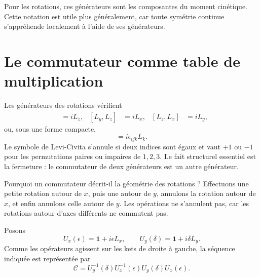 Pour les rotations, ces générateurs sont les composantes du moment cinétique. Cette notation est utile plus généralement, car toute symétrie continue s’appréhende localement à l’aide de ses générateurs.

\section{Le commutateur comme table de multiplication}

Les générateurs des rotations vérifient
\begin{align}
[L_x,L_y]&=iL_z,&
[L_y,L_z]&=iL_x,&
[L_z,L_x]&=iL_y,
\end{align}ou, sous une forme compacte,
\begin{equation}
[L_i,L_j]=i\epsilon_{ijk}L_k.
\end{equation}
Le symbole de Levi-Civita s’annule si deux indices sont égaux et vaut \(+1\) ou \(-1\) pour les permutations paires ou impaires de \(1,2,3\). Le fait structurel essentiel est la fermeture : le commutateur de deux générateurs est un autre générateur.

Pourquoi un commutateur décrit-il la géométrie des rotations ? Effectuons une petite rotation autour de \(x\), puis une autour de \(y\), annulons la rotation autour de \(x\), et enfin annulons celle autour de \(y\). Les opérations ne s’annulent pas, car les rotations autour d’axes différents ne commutent pas.

\begin{classroomqa}
\end{classroomqa}

Posons
\begin{equation}
U_x(\epsilon)=\mathbf 1+i\epsilon L_x,
\qquad
U_y(\delta)=\mathbf 1+i\delta L_y.
\end{equation}
Comme les opérateurs agissent sur les kets de droite à gauche, la séquence indiquée est représentée par
\begin{equation}
\mathcal C
=U_y^{-1}(\delta)U_x^{-1}(\epsilon)
 U_y(\delta)U_x(\epsilon).
\end{equation}

\begin{classroomqa}
\end{classroomqa}

